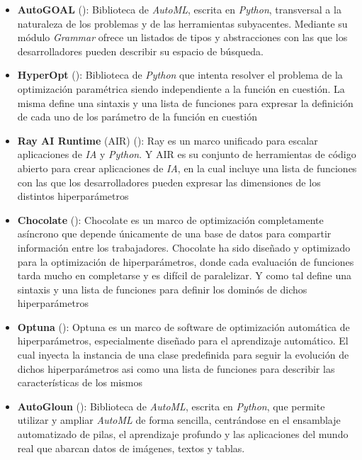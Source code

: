 \begin{itemize}

    \item  {\bf AutoGOAL} (\cite{autogoal}): Biblioteca de {\it AutoML}, escrita en {\it Python}, transversal a la
          naturaleza de los problemas y de las herramientas subyacentes. Mediante su módulo {\it Grammar}
          ofrece un listados de tipos y abstracciones con las que los desarrolladores pueden describir
          su espacio de búsqueda.
    \item {\bf HyperOpt} (\cite{hyperopt}): Biblioteca de {\it Python} que intenta resolver el problema de la optimización
          paramétrica siendo independiente a la función en cuestión. La misma define una sintaxis y
          una lista de funciones para expresar la definición de cada uno de los parámetro de la
          función en cuestión
    \item {\bf Ray AI Runtime} (AIR) (\cite{ray}): Ray es un marco unificado para escalar aplicaciones de {\it IA} y
              {\it Python}. Y AIR es su conjunto de herramientas de código abierto para crear aplicaciones de
              {\it IA}, en la cual incluye una lista de funciones con las que los desarrolladores pueden expresar
          las dimensiones de los distintos hiperparámetros
    \item {\bf Chocolate} (\cite{chocolate}): Chocolate es un marco de optimización completamente asíncrono que depende
          únicamente de una base de datos para compartir información entre los trabajadores. Chocolate
          ha sido diseñado y optimizado para la optimización de hiperparámetros, donde cada evaluación
          de funciones tarda mucho en completarse y es difícil de paralelizar. Y como tal define una
          sintaxis y una lista de funciones para definir los dominós de dichos hiperparámetros
    \item {\bf Optuna} ({\cite{optuna}}): Optuna es un marco de software de optimización automática de hiperparámetros,
          especialmente diseñado para el aprendizaje automático. El cual inyecta la instancia de una
          clase predefinida para seguir la evolución de dichos hiperparámetros asi como
          una lista de funciones para describir las características de los mismos
    \item {\bf AutoGloun} (\cite{autogloun}): Biblioteca de {\it AutoML}, escrita en {\it Python}, que permite utilizar y
          ampliar {\it AutoML} de forma sencilla, centrándose en el ensamblaje automatizado de pilas, el
          aprendizaje profundo y las aplicaciones del mundo real que abarcan datos de imágenes, textos y tablas.

\end{itemize}
